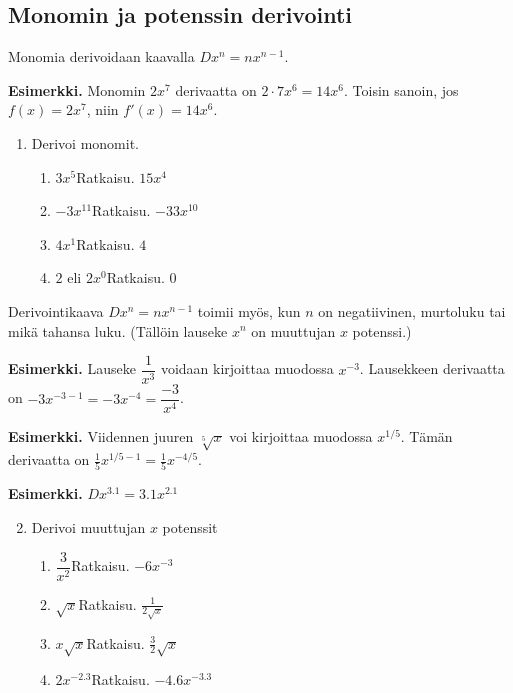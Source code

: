 \documentclass[10pt]{article}
\newcommand{\ratkaisu}[1]{\hfill{\color{blue}\quad\textrm{Ratkaisu. } #1}}
\begin{document}
\subsection{Monomin ja potenssin derivointi}

Monomia derivoidaan kaavalla $D x^n=nx^{n-1}$.

\textbf{Esimerkki.} Monomin $2x^7$ derivaatta on $2\cdot 7x^6=14x^6$. Toisin sanoin, jos $f(x)=2x^7$, niin $f'(x)=14x^6$.

\begin{enumerate}
\item Derivoi monomit.
\begin{enumerate}
\item $3x^5$\ratkaisu{$15x^4$}
\item $-3x^{11}$\ratkaisu{$-33x^{10}$}
\item $4x^1$\ratkaisu{$4$}
\item $2$ eli $2x^0$\ratkaisu{$0$}
\end{enumerate}
\end{enumerate}


Derivointikaava $D x^n=nx^{n-1}$ toimii myös, kun $n$ on negatiivinen, murtoluku tai mikä tahansa luku. (Tällöin lauseke $x^n$ on muuttujan $x$ potenssi.)

\textbf{Esimerkki.} Lauseke $\dfrac{1}{x^3}$ voidaan kirjoittaa muodossa $x^{-3}$. Lausekkeen derivaatta on $-3x^{-3-1}=-3x^{-4}=\dfrac{-3}{x^4}$.

\textbf{Esimerkki.} Viidennen juuren $\sqrt[5]{x}$ voi kirjoittaa muodossa $x^{1/5}$. Tämän derivaatta on $\frac15x^{1/5-1}=\frac15x^{-4/5}$.

\textbf{Esimerkki.} $Dx^{3.1}=3.1x^{2.1}$

\begin{enumerate}
\setcounter{enumi}{1}
\item Derivoi muuttujan $x$ potenssit
\begin{enumerate}
\item $\dfrac{3}{x^2}$\ratkaisu{$-6x^{-3}$}
\item $\sqrt{x}$\ratkaisu{$\frac{1}{2\sqrt{x}}$}
\item $x\sqrt{x}$\ratkaisu{$\frac32\sqrt{x}$}
\item $2x^{-2.3}$\ratkaisu{$-4.6x^{-3.3}$}
\end{enumerate}
\end{enumerate}
\end{document}
